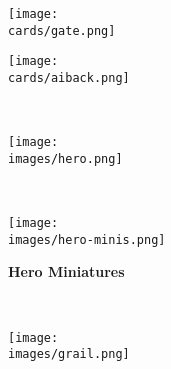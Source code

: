 \begin{figure}[H]
  \centering
  \hfill
  \begin{subfigure}[c]{0.23\linewidth}
    \centering
    \caption{\textbf{}}
  \end{subfigure}
  \hfill
  \begin{subfigure}[c]{0.23\linewidth}
    \centering
    \caption{\textbf{}}
  \end{subfigure}
  \hfill
  \begin{subfigure}[c]{0.23\linewidth}
    \centering
    \texttt{[image: \\cards/gate.png]}
    \caption{\textbf{}}
  \end{subfigure}
  \hfill
  \begin{subfigure}[c]{0.23\linewidth}
    \centering
    \texttt{[image: \\cards/aiback.png]}
    \caption{\textbf{}}
  \end{subfigure}
  \hfill
  ~
\end{figure}

\clearpage

\begin{figure}[H]
  \centering
  \begin{subfigure}[c]{0.3\linewidth}
    \texttt{[image: \\images/hero.png]}
    \caption{\textbf{}}
  \end{subfigure}
  ~
  \begin{subfigure}[c]{0.4\linewidth}
    \centering
    \texttt{[image: \\images/hero-minis.png]}
    \caption{\textbf{Hero Miniatures}}
  \end{subfigure}
  ~
  \begin{subfigure}[c]{0.12\linewidth}
    \centering
    \texttt{[image: \\images/grail.png]}
    \caption{\textbf{}}
  \end{subfigure}
\end{figure}

